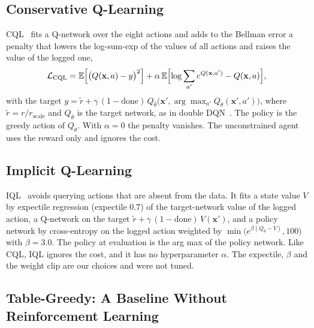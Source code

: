 \subsection{Conservative Q-Learning}
\label{sec:cql}

CQL~\cite{TODO-cql} fits a Q-network over the eight actions and adds to the Bellman error a penalty that lowers the log-sum-exp of the values of all actions and raises the value of the logged one,
\begin{equation}
  \mathcal{L}_{\mathrm{CQL}}=\mathbb{E}\Bigl[\bigl(Q(\mathbf{x},a)-y\bigr)^{2}\Bigr]+\alpha\,\mathbb{E}\Bigl[\log\sum_{a'}e^{Q(\mathbf{x},a')}-Q(\mathbf{x},a)\Bigr],
  \label{eq:cql}
\end{equation}%
with the target $y=\tilde r+\gamma\,(1-\mathrm{done})\,Q_{\bar\theta}\bigl(\mathbf{x}',\arg\max_{a'}Q_\theta(\mathbf{x}',a')\bigr)$, where $\tilde r=r/r_{\mathrm{scale}}$ and $Q_{\bar\theta}$ is the target network, as in double DQN~\cite{TODO-double-dqn}.%
The policy is the greedy action of $Q_\theta$.%
With $\alpha=0$ the penalty vanishes.%
The unconstrained agent uses the reward only and ignores the cost.%

\subsection{Implicit Q-Learning}
\label{sec:iql}

IQL~\cite{TODO-iql} avoids querying actions that are absent from the data.%
It fits a state value $V$ by expectile regression (expectile $0.7$) of the target-network value of the logged action, a Q-network on the target $\tilde r+\gamma\,(1-\mathrm{done})\,V(\mathbf{x}')$, and a policy network by cross-entropy on the logged action weighted by $\min\bigl(e^{\beta(Q_{\bar\theta}-V)},100\bigr)$ with $\beta=3.0$.%
The policy at evaluation is the arg max of the policy network.%
Like CQL, IQL ignores the cost, and it has no hyperparameter $\alpha$.%
The expectile, $\beta$ and the weight clip are our choices and were not tuned.%

\subsection{Table-Greedy: A Baseline Without Reinforcement Learning}
\label{sec:tablegreedy}

